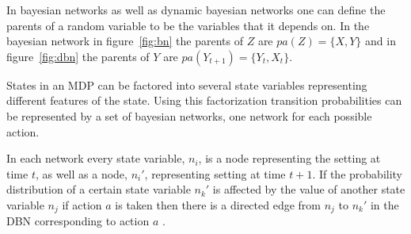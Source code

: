 In bayesian networks as well as dynamic bayesian networks one can define the
parents of a random variable to be the variables that it depends on. In the
bayesian network in figure~\ref{fig:bn} the parents of $Z$ are $pa(Z) = \{X,
Y\}$ and in figure~\ref{fig:dbn} the parents of $Y$ are $pa(Y_{t+1}) = \{Y_t,
X_t\}$.

States in an MDP can be factored into several state variables representing
different features of the state. Using this factorization transition
probabilities can be represented by a set of bayesian networks, one network for
each possible action. 

In each network every state variable, $n_i$, is a node representing the setting
at time $t$, as well as a node, $n_i'$, representing setting at time $t+1$. If
the probability distribution of a certain state variable $n_k'$ is affected by
the value of another state variable $n_j$ if action $a$ is taken then there is
a directed edge from $n_j$ to $n_k'$ in the DBN corresponding to action $a$
\parencite{guestrin2003efficient}.
